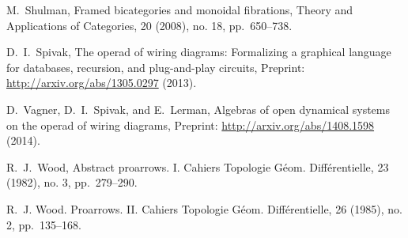 \documentclass[11pt,oneside,article]{memoir}
\begin{document}
\begin{thebibliography}{XXX}
 M.~Shulman, Framed bicategories and monoidal fibrations, Theory and Applications of Categories, 20 (2008), no. 18, pp.~650--738.

 D.~I.~Spivak, The operad of wiring diagrams: Formalizing a graphical language for databases, recursion, and plug-and-play circuits, Preprint: \url{http://arxiv.org/abs/1305.0297} (2013).

 D.~Vagner, D.~I.~Spivak, and E.~Lerman, Algebras of open dynamical systems on the operad of wiring diagrams, Preprint: \url{http://arxiv.org/abs/1408.1598} (2014).

 R.~J.~Wood, Abstract proarrows. I. Cahiers Topologie G\'{e}om. Diff\'{e}rentielle, 23 (1982), no. 3, pp.~279--290.

 R.~J. Wood. Proarrows. II. Cahiers Topologie G\'{e}om. Diff\'{e}rentielle, 26 (1985), no. 2, pp.~135--168.

\end{thebibliography}
\end{document}
